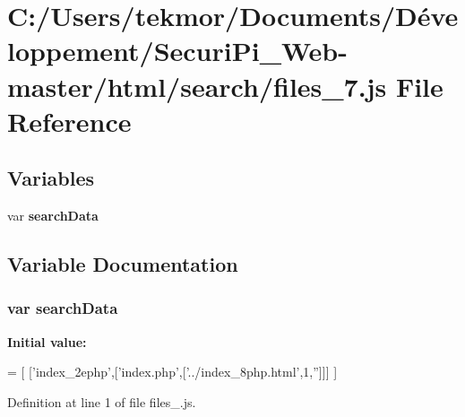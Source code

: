 \section{C\+:/\+Users/tekmor/\+Documents/\+Développement/\+Securi\+Pi\+\_\+\+Web-\/master/html/search/files\+\_\+7.js File Reference}
\label{files__7_8js}
\subsection*{Variables}
\begin{DoxyCompactItemize}
\item 
var {\bf search\+Data}
\end{DoxyCompactItemize}


\subsection{Variable Documentation}
\subsubsection[{search\+Data}]{\setlength{\rightskip}{0pt plus 5cm}var search\+Data}\label{files__7_8js_ad01a7523f103d6242ef9b0451861231e}
{\bfseries Initial value\+:}
\begin{DoxyCode}
=
[
  [\textcolor{stringliteral}{'index\_2ephp'},[\textcolor{stringliteral}{'index.php'},[\textcolor{stringliteral}{'../index\_8php.html'},1,\textcolor{stringliteral}{''}]]]
]
\end{DoxyCode}


Definition at line 1 of file files\+\_.\+js.

